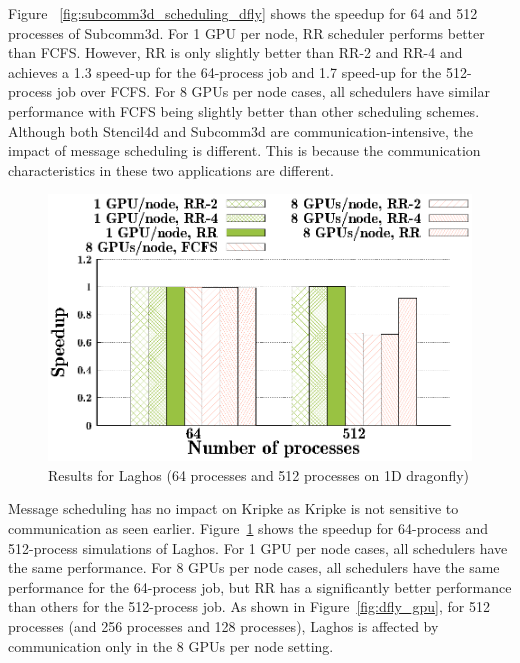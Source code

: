 Figure ~\ref{fig:subcomm3d_scheduling_dfly} shows the speedup for 64 and 512
processes of Subcomm3d.  For 1 GPU per node, RR scheduler performs better
than FCFS. However, RR is only slightly better than RR-2 and RR-4 and achieves a
1.3 speed-up for the 64-process job and 1.7 speed-up for the 512-process job
over FCFS.  For 8 GPUs per node cases, all schedulers have similar performance
with FCFS being slightly better than other scheduling schemes. Although both
Stencil4d and Subcomm3d are communication-intensive, the impact of message
scheduling is different. This is because the communication characteristics in
these two applications are different. 

\begin{figure}[t]
  \centering
  \includegraphics[width=0.8\columnwidth]{figure/plots/sched/dfly-sched-mapping-laghos.eps}
  \vspace{-0.5in}
    \caption{Results for Laghos (64 processes and 512 processes on 1D dragonfly)}
  \label{fig:laghos_scheduling_dfly}
\end{figure}


Message scheduling has no impact on Kripke as Kripke is not sensitive to
communication as seen earlier. Figure~\ref{fig:laghos_scheduling_dfly} shows
the speedup for 64-process and 512-process simulations of Laghos. For 1 GPU per node cases, all
schedulers have the same performance. For 8 GPUs per node cases, all schedulers
have the same performance for the 64-process job, but RR has a significantly
better performance than others for the 512-process job. As shown in
Figure~\ref{fig:dfly_gpu}, for 512 processes (and 256 processes and 128
processes), Laghos is affected by communication only in the 8 GPUs per node
setting.


